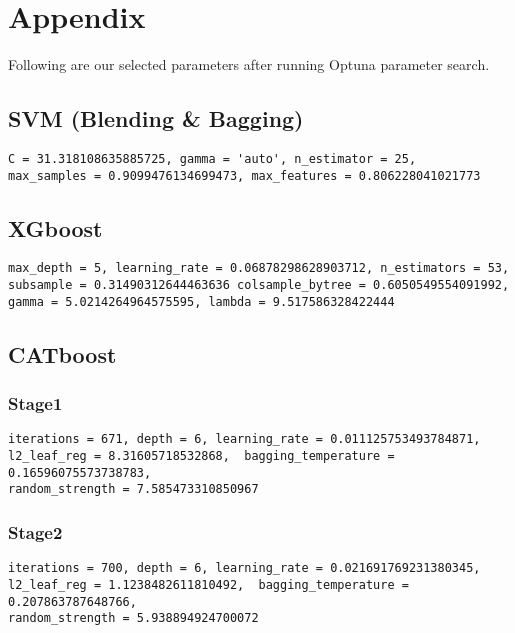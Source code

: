 \section{Appendix}
\par Following are our selected parameters after running Optuna parameter search.
\subsection*{SVM (Blending \& Bagging)}
\begin{lstlisting}
C = 31.318108635885725, gamma = 'auto', n_estimator = 25, 
max_samples = 0.9099476134699473, max_features = 0.806228041021773
\end{lstlisting}

\subsection*{XGboost}
\begin{lstlisting}
max_depth = 5, learning_rate = 0.06878298628903712, n_estimators = 53, 
subsample = 0.31490312644463636 colsample_bytree = 0.6050549554091992, 
gamma = 5.0214264964575595, lambda = 9.517586328422444
\end{lstlisting}

\subsection*{CATboost}
\subsubsection*{Stage1}
\begin{lstlisting}
iterations = 671, depth = 6, learning_rate = 0.011125753493784871, 
l2_leaf_reg = 8.31605718532868,  bagging_temperature = 0.16596075573738783, 
random_strength = 7.585473310850967
\end{lstlisting}
\subsubsection*{Stage2}
\begin{lstlisting}
iterations = 700, depth = 6, learning_rate = 0.021691769231380345, 
l2_leaf_reg = 1.1238482611810492,  bagging_temperature = 0.207863787648766,
random_strength = 5.938894924700072
\end{lstlisting}